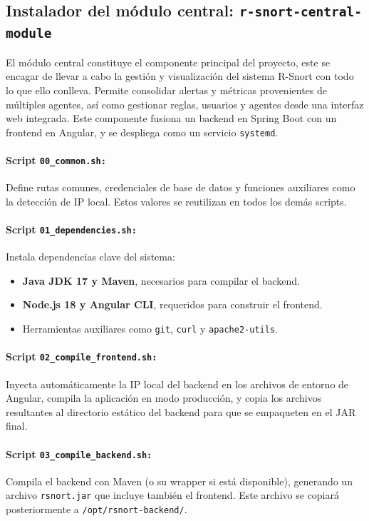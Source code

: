\documentclass[11pt,a4paper,twoside]{report}
\begin{document}

\subsection{Instalador del módulo central: \texttt{r-snort-central-module}}

El módulo central constituye el componente principal del proyecto, este se encagar de llevar a cabo la gestión y visualización del sistema R-Snort con todo lo que ello conlleva. Permite consolidar alertas y métricas provenientes de múltiples agentes, así como gestionar reglas, usuarios y agentes desde una interfaz web integrada. Este componente fusiona un backend en Spring Boot con un frontend en Angular, y se despliega como un servicio \texttt{systemd}.

\paragraph{Script \texttt{00\_common.sh:}} Define rutas comunes, credenciales de base de datos y funciones auxiliares como la detección de IP local. Estos valores se reutilizan en todos los demás scripts.

\paragraph{Script \texttt{01\_dependencies.sh:}} Instala dependencias clave del sistema:
\begin{itemize}
	\item \textbf{Java JDK 17 y Maven}, necesarios para compilar el backend.
	\item \textbf{Node.js 18 y Angular CLI}, requeridos para construir el frontend.
	\item Herramientas auxiliares como \texttt{git}, \texttt{curl} y \texttt{apache2-utils}.
\end{itemize}

\paragraph{Script \texttt{02\_compile\_frontend.sh:}} Inyecta automáticamente la IP local del backend en los archivos de entorno de Angular, compila la aplicación en modo producción, y copia los archivos resultantes al directorio estático del backend para que se empaqueten en el JAR final.

\paragraph{Script \texttt{03\_compile\_backend.sh:}} Compila el backend con Maven (o su wrapper si está disponible), generando un archivo \texttt{rsnort.jar} que incluye también el frontend. Este archivo se copiará posteriormente a \texttt{/opt/rsnort-backend/}.
\end{document}
